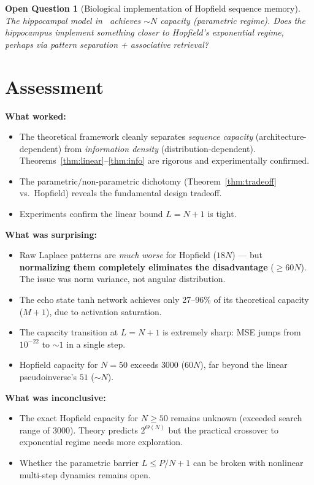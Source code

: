 \documentclass[11pt]{article}
\newtheorem{question}[theorem]{Open Question}
\theoremstyle{definition}
\theoremstyle{remark}
\begin{document}
\begin{question}[Biological implementation of Hopfield sequence memory]
The hippocampal model in~\cite{plos2024oneshot} achieves $\sim N$ capacity (parametric regime). Does the hippocampus implement something closer to Hopfield's exponential regime, perhaps via pattern separation + associative retrieval?
\end{question}

\section{Assessment}

\textbf{What worked:}
\begin{itemize}
    \item The theoretical framework cleanly separates \emph{sequence capacity} (architecture-dependent) from \emph{information density} (distribution-dependent). Theorems~\ref{thm:linear}--\ref{thm:info} are rigorous and experimentally confirmed.
    \item The parametric/non-parametric dichotomy (Theorem~\ref{thm:tradeoff} vs.\ Hopfield) reveals the fundamental design tradeoff.
    \item Experiments confirm the linear bound $L = N + 1$ is tight.
\end{itemize}

\textbf{What was surprising:}
\begin{itemize}
    \item Raw Laplace patterns are \emph{much worse} for Hopfield ($18N$) --- but \textbf{normalizing them completely eliminates the disadvantage} ($\geq 60N$). The issue was norm variance, not angular distribution.
    \item The echo state tanh network achieves only 27--96\% of its theoretical capacity ($M + 1$), due to activation saturation.
    \item The capacity transition at $L = N + 1$ is extremely sharp: MSE jumps from $10^{-22}$ to $\sim 1$ in a single step.
    \item Hopfield capacity for $N = 50$ exceeds $3000$ ($60N$), far beyond the linear pseudoinverse's $51$ ($\sim N$).
\end{itemize}

\textbf{What was inconclusive:}
\begin{itemize}
    \item The exact Hopfield capacity for $N \geq 50$ remains unknown (exceeded search range of $3000$). Theory predicts $2^{\Theta(N)}$ but the practical crossover to exponential regime needs more exploration.
    \item Whether the parametric barrier $L \leq P/N + 1$ can be broken with nonlinear multi-step dynamics remains open.
\end{itemize}
\end{document}
